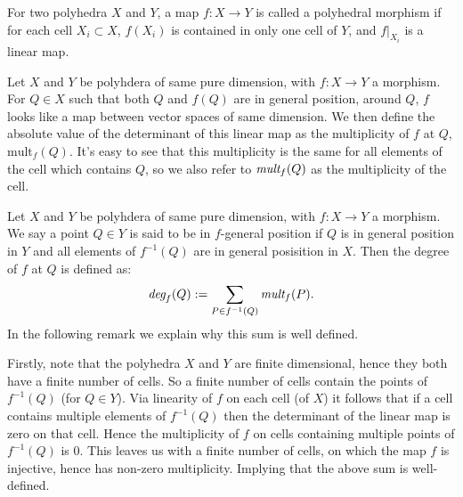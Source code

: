 \begin{definition}
   For two polyhedra $X$ and $Y$, a map $f:X \to Y$ is called a polyhedral morphism if for each cell $X_{i}\subset X$, $f(X_{i})$ is contained in only one cell of $Y$, and $f|_{X_{i}}$ is a linear map. 
\end{definition}

\begin{definition}
    Let $X$ and $Y$ be polyhdera of same pure dimension, with $f:X\to Y$ a morphism. 
    For $Q\in X$ such that both $Q$ and $f(Q)$ are in general position, around $Q$, $f$ looks like a map between vector spaces of same dimension.
    We then define the absolute value of the determinant of this linear map as the multiplicity of $f$ at $Q$, $\text{mult}_{f}(Q)$.
    It's easy to see that this multiplicity is the same for all elements of the cell which contains $Q$, so we also refer to $\emph{mult}_{f}(Q)$ as the multiplicity of the cell.
\end{definition}

\begin{definition}
    Let $X$ and $Y$ be polyhdera of same pure dimension, with $f:X\to Y$ a morphism. 
    We say a point $Q \in Y$ is said to be in $f$-general position if $Q$ is in general position in $Y$ and all elements of $f^{-1}(Q)$ are in general posisition in $X$.
    Then the degree of $f$ at $Q$ is defined as:
    \[
        \emph{deg}_{f}(Q):= \sum_{P \in f^{-1}(Q)}\emph{mult}_{f}(P).
    \]
    In the following remark we explain why this sum is well defined.
\end{definition}

\begin{remark}
    Firstly, note that the polyhedra $X$ and $Y$ are finite dimensional, hence they both have a finite number of cells. 
    So a finite number of cells contain the points of $f^{-1}(Q)$ (for $Q\in Y$).
    Via linearity of $f$ on each cell (of $X$) it follows that if a cell contains multiple elements of $f^{-1}(Q)$ then the determinant of the linear map is zero on that cell. 
    Hence the multiplicity of $f$ on cells containing multiple points of $f^{-1}(Q)$ is $0$.
    This leaves us with a finite number of cells, on which the map $f$ is injective, hence has non-zero multiplicity. 
    Implying that the above sum is well-defined.
\end{remark}

